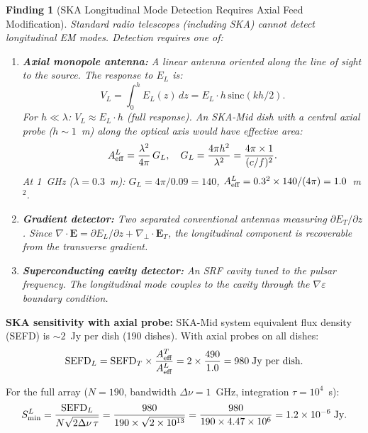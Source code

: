 \documentclass[11pt]{article}
\newtheorem{finding}{Finding}
\newcommand{\ee}[1]{\times 10^{#1}}
\newcommand{\Evec}{\mathbf{E}}
\begin{document}
\begin{finding}[SKA Longitudinal Mode Detection Requires Axial Feed
Modification]
\label{find:ska}
Standard radio telescopes (including SKA) cannot detect longitudinal
EM modes. Detection requires one of:

\begin{enumerate}
\item \textbf{Axial monopole antenna:} A linear antenna oriented
along the line of sight to the source. The response to $E_L$ is:
\begin{equation}
V_L = \int_0^h E_L(z)\,dz = E_L \cdot h\,\text{sinc}(k h/2).
\end{equation}
For $h \ll \lambda$: $V_L \approx E_L \cdot h$ (full response).
An SKA-Mid dish with a central axial probe ($h \sim 1$~m) along the
optical axis would have effective area:
\begin{equation}
A_{\rm eff}^L = \frac{\lambda^2}{4\pi}\,G_L,
\quad G_L = \frac{4\pi h^2}{\lambda^2}
= \frac{4\pi \times 1}{(c/f)^2}.
\end{equation}
At 1~GHz ($\lambda = 0.3$~m): $G_L = 4\pi/0.09 = 140$,
$A_{\rm eff}^L = 0.3^2 \times 140/(4\pi) = 1.0$~m$^2$.

\item \textbf{Gradient detector:} Two separated conventional antennas
measuring $\partial E_T/\partial z$. Since
$\nabla \cdot \Evec = \partial E_L/\partial z + \nabla_\perp \cdot
\Evec_T$, the longitudinal component is recoverable from the
transverse gradient.

\item \textbf{Superconducting cavity detector:} An SRF cavity tuned
to the pulsar frequency. The longitudinal mode couples to the cavity
through the $\nabla\varepsilon$ boundary condition.
\end{enumerate}
\end{finding}

\textbf{SKA sensitivity with axial probe:}
SKA-Mid system equivalent flux density (SEFD) is $\sim 2$~Jy per
dish (190 dishes). With axial probes on all dishes:
\begin{equation}
\text{SEFD}_L = \text{SEFD}_T \times \frac{A_{\rm eff}^T}{A_{\rm eff}^L}
= 2 \times \frac{490}{1.0} = 980\;\text{Jy per dish}.
\end{equation}

For the full array ($N = 190$, bandwidth $\Delta\nu = 1$~GHz,
integration $\tau = 10^4$~s):
\begin{equation}
S_{\rm min}^L = \frac{\text{SEFD}_L}{N\sqrt{2\Delta\nu\,\tau}}
= \frac{980}{190 \times \sqrt{2\ee{13}}}
= \frac{980}{190 \times 4.47\ee{6}}
= 1.2\ee{-6}\;\text{Jy}.
\end{equation}
\end{document}
